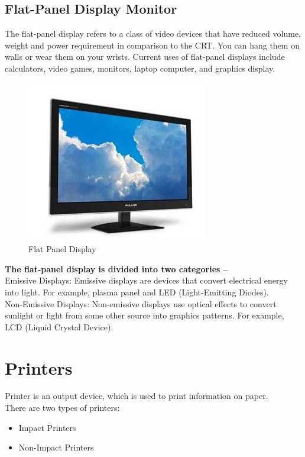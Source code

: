 \documentclass[11pt,a4paper,twoside]{article}
\begin{document}
\subsection{Flat-Panel Display Monitor} 
The flat-panel display refers to a class of video devices that have reduced volume, weight and power requirement in comparison to the CRT. You can hang them on walls or wear them on your wrists. Current uses of flat-panel displays include calculators, video games, monitors, laptop computer, and graphics display.
\begin{figure}[H]
\centering \includegraphics[scale=1]{Fig 14.jpg}
\caption{Flat Panel Display}
\end{figure}
\noindent \textbf{The flat-panel display is divided into two categories –}\\
Emissive Displays: Emissive displays are devices that convert electrical energy into light. For example, plasma panel and LED (Light-Emitting Diodes).\\  
Non-Emissive Displays: Non-emissive displays use optical effects to convert sunlight or light from some other source into graphics patterns. For example, LCD (Liquid Crystal Device).

\section{Printers}  Printer is an output device, which is used to print information on paper. \\
There are two types of printers:  
\begin{itemize}
    \item Impact Printers
\item Non-Impact Printers
\end{itemize}
\end{document}
